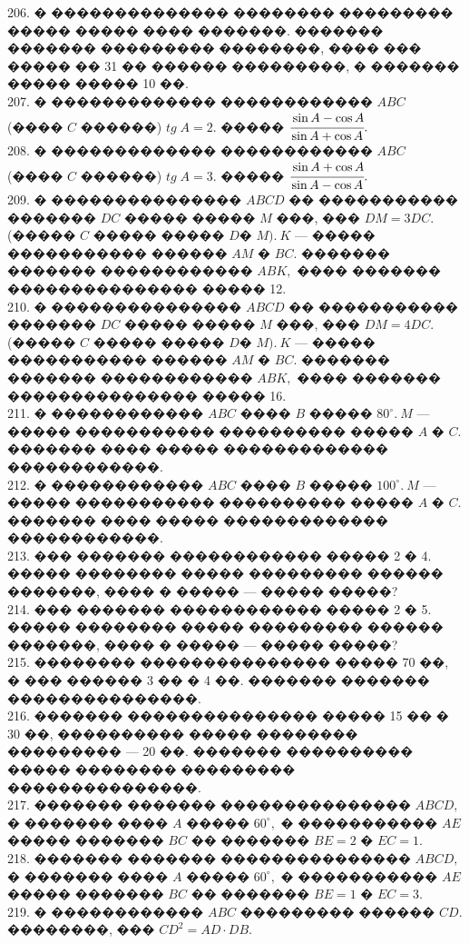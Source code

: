 \documentclass[12pt]{article}
\begin{document}
206. � �������������� �������� ��������� ����� ����� ���� �������. ������� ������� ��������� ��������, ���� ��� ����� �� 31 �� ������ ���������, � ������� ����� ����� 10 ��.\\
207. � ������������� ������������ $ABC$ (���� $C$ ������) $tg\; A=2.$ ����� $\cfrac{\sin A -\cos A}{\sin A +\cos A}.$\\
208. � ������������� ������������ $ABC$ (���� $C$ ������) $tg\; A=3.$ ����� $\cfrac{\sin A +\cos A}{\sin A - \cos A}.$\\
209. � ��������������� $ABCD$ �� ����������� ������� $DC$ ����� ����� $M$ ���, ��� $DM=3DC.$ (����� $C$
����� ����� $D$� $M).\ K$ --- ����� ����������� ������ $AM$ � $BC.$ ������� ������� ������������ $ABK,$ ����
������� ��������������� ����� 12.\\
210. � ��������������� $ABCD$ �� ����������� ������� $DC$ ����� ����� $M$ ���, ��� $DM=4DC.$ (����� $C$
����� ����� $D$� $M).\ K$ --- ����� ����������� ������ $AM$ � $BC.$ ������� ������� ������������ $ABK,$ ����
������� ��������������� ����� 16.\\
211. � ������������ $ABC$ ���� $B$ ����� $80^\circ.\ M$ --- ����� ����������� ���������� ����� $A$ � $C.$
������� ���� ����� ������������� ������������.\\
212. � ������������ $ABC$ ���� $B$ ����� $100^\circ.\ M$ --- ����� ����������� ���������� ����� $A$ � $C.$
������� ���� ����� ������������� ������������.\\
213. ��� ������� ������������ ����� 2 � 4. ����� �������� ����� ��������� ������ �������, ���� � ����� --- ����� �����?\\
214. ��� ������� ������������ ����� 2 � 5. ����� �������� ����� ��������� ������ �������, ���� � ����� --- ����� �����?\\
215. �������� ��������������� ����� 70 ��, � ��� ������ 3 �� � 4 ��. ������� ������� ���������������.\\
216. ������� ��������������� ����� 15 �� � 30 ��, ���������� ����� �������� ��������� --- 20 ��. ������� ���������� ����� �������� ��������� ���������������.\\
217. ������� ������� ��������������� $ABCD,$ � ������� ���� $A$ ����� $60^\circ,$ � ����������� $AE$ ����� ������� $BC$ �� ������� $BE=2$ � $EC=1.$\\
218. ������� ������� ��������������� $ABCD,$ � ������� ���� $A$ ����� $60^\circ,$ � ����������� $AE$ ����� ������� $BC$ �� ������� $BE=1$ � $EC=3.$\\
219. � ������������ $ABC$ ��������� ������ $CD.$ ��������, ��� $CD^2=AD\cdot DB.$\\
\end{document}
